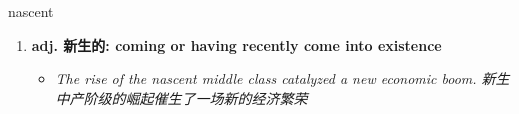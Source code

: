 
\begin{frame}
{\huge nascent}
\begin{center}
\begin{enumerate}\Large
  \item \textbf{adj. 新生的: coming or having recently come into existence}
  \begin{itemize}
    \item \em{\Large{The rise of the nascent middle class catalyzed a new economic boom. 新生中产阶级的崛起催生了一场新的经济繁荣}}
  \end{itemize}
\end{enumerate}
\end{center}
\end{frame}
